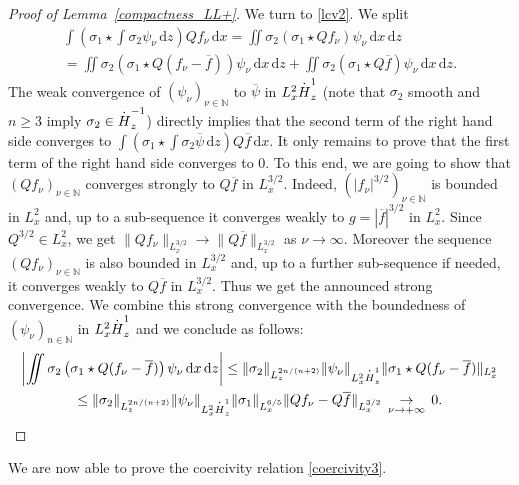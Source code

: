 \documentclass[11pt]{article}
\let\oldbar\bar\let\oldhat\hat\let\oldtilde\tilde
\let\bar\oldbar
\let\hat\oldhat
\let\tilde\oldtilde
\DeclareRobustCommand{\accentset}[2]{\overset{#1}{#2}}
\theoremstyle{definition}
\newcommand*{\overbigdot}[1]{%
\accentset{\mbox{\large\bfseries .}}{#1}}
\let\bar\overline
\let\hat\widehat
\let\tilde\widetilde
\newenvironment{ProofOf}[1]{\begin{proof}[Proof of #1]}{\end{proof}}
\newcommand{\ud}{\, {\mathrm{d}}}
\begin{document}
\begin{ProofOf}{Lemma~\ref{compactness_LL+}}
We turn to \eqref{lcv2}. We split
\begin{multline*}
\int\left(\sigma_{1}\star\int\sigma_{2}\psi_{\nu}\ud z\right)Qf_{\nu}\ud x=\iint\sigma_{2}\left(\sigma_{1}\star Qf_{\nu}\right)\psi_{\nu}\ud x\ud z\\
=\iint\sigma_{2}\left(\sigma_{1}\star Q(f_{\nu}-\bar{f})\right)\psi_{\nu}\ud x\ud z+\iint\sigma_{2}\left(\sigma_{1}\star Q\bar{f}\right)\psi_{\nu}\ud x\ud z.
\end{multline*}
The weak convergence of $(\psi_{\nu})_{\nu\in\mathbb N}$ to $\bar{\psi}$ in $L_{x}^{2}\overbigdot{H}_{z}^{1}$ (note that $\sigma_{2}$ smooth and $n\geq 3$ imply $\sigma_{2}\in\overbigdot{H}_{z}^{-1}$) directly implies that
the second term of the right hand side converges to $\int(\sigma_{1}\star\int\sigma_{2}\bar{\psi}\ud z)Q\bar{f}\ud x$.
It only remains to prove that the first term of the right hand side converges to $0$.
To this end, we are going to show
that $(Qf_{\nu})_{\nu\in\mathbb N}$ converges strongly to $Q\bar{f}$ in $L_{x}^{3/2}$. Indeed, $(|f_{\nu}|^{3/2})_{\nu\in\mathbb N}$ is bounded in $L_{x}^{2}$ and, up to a sub-sequence it converges weakly to $g=|\bar{f}|^{3/2}$ in $L_{x}^{2}$. Since $Q^{3/2}\in L_{x}^{2}$, we get $\|Qf_{\nu}\|_{L_{x}^{3/2}}\to\|Q\bar{f}\|_{L_{x}^{3/2}}$ as $\nu\to \infty$. Moreover the sequence $(Qf_{\nu})_{\nu\in\mathbb N}$ is also bounded in $L_{x}^{3/2}$ and, up to a further sub-sequence if needed, it converges weakly to $Q\bar{f}$ in $L_{x}^{3/2}$. Thus we get the announced strong convergence. We combine this strong convergence with the boundedness of $(\psi_{\nu})_{n\in \mathbb N}$ in $L_{x}^{2}\overbigdot{H}_{z}^{1}$ and we conclude as follows:
\bgroup
{}
\begin{multline*}
\left|\iint\sigma_{2}\left(\sigma_{1}\star Q(f_{\nu}-\bar{f})\right)\psi_{\nu}\ud x\ud z\right|\leq\|\sigma_{2}\|_{L_{z}^{2n/(n+2)}}\|\psi_{\nu}\|_{L_{x}^{2}\overbigdot{H}_{z}^{1}}\|\sigma_{1}\star Q(f_{\nu}-\bar{f})\|_{L_{x}^{2}}\\
\leq\|\sigma_{2}\|_{L_{z}^{2n/(n+2)}}\|\psi_{\nu}\|_{L_{x}^{2}\overbigdot{H}_{z}^{1}}\|\sigma_{1}\|_{L_{x}^{6/5}}\|Qf_{\nu}-Q\bar{f}\|_{L_{x}^{3/2}}\,\underset{\nu\to+\infty}{\to}\,0.\qedhere
\end{multline*}\egroup
\end{ProofOf}

We are now able to prove the coercivity relation \eqref{coercivity3}.
\end{document}
